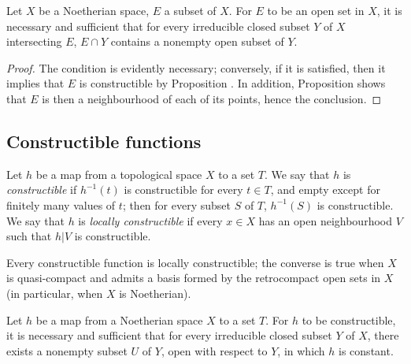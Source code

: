 \begin{corollary}[9.2.6]
\label{0.9.2.6}
Let $X$ be a Noetherian space, $E$ a subset of $X$.
For $E$ to be an open set in $X$, it is necessary and sufficient that for every irreducible closed subset $Y$ of $X$ intersecting $E$, $E\cap Y$ contains a nonempty open subset of $Y$.
\end{corollary}

\begin{proof}
The condition is evidently necessary; conversely, if it is satisfied, then it implies that $E$ is constructible by Proposition .
In addition, Proposition  shows that $E$ is then a neighbourhood of each of its points, hence the conclusion.
\end{proof}

\subsection{Constructible functions}
\label{subsection:0.9.3}

\begin{definition}[9.3.1]
\label{0.9.3.1}
Let $h$ be a map from a topological space $X$ to a set $T$.
We say that $h$ is \emph{constructible} if $h^{-1}(t)$ is constructible for every $t\in T$, and empty except for finitely many values of $t$; then for every subset $S$ of $T$, $h^{-1}(S)$ is constructible.
We say that $h$ is \emph{locally constructible} if every $x\in X$ has an open neighbourhood $V$ such that $h|V$ is constructible.
\end{definition}

Every constructible function is locally constructible; the converse is true when $X$ is quasi-compact and admits a basis formed by the retrocompact open sets in $X$ (in particular, when $X$ is Noetherian).

\begin{proposition}[9.3.2]
\label{0.9.3.2}
Let $h$ be a map from a Noetherian space $X$ to a set $T$.
For $h$ to be constructible, it is necessary and sufficient that for every irreducible closed subset $Y$ of $X$, there exists a nonempty subset $U$ of $Y$, open with respect to $Y$, in which $h$ is constant.
\end{proposition}

